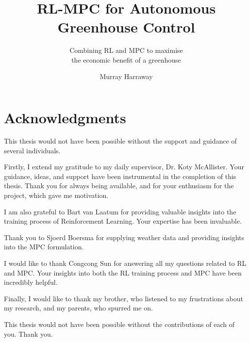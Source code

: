 \documentclass{tudelft-report}
\begin{document}
\frontmatter

\title{RL-MPC for Autonomous Greenhouse Control}
\subtitle{Combining RL and MPC to maximise  \\ the economic benefit of a greenhouse}
\author{Murray Harraway}

\subject{Systems and Control Masters Thesis} %

\makecover


% 
%


\tableofcontents


\newpage
\section*{Acknowledgments}
This thesis would not have been possible without the support and guidance of several individuals.

Firstly, I extend my gratitude to my daily supervisor, Dr. Koty McAllister. Your guidance, ideas, and support have been instrumental in the completion of this thesis. Thank you for always being available, and for your enthusiasm for the project, which gave me motivation.

I am also grateful to Bart van Laatum for providing valuable insights into the training process of Reinforcement Learning. Your expertise has been invaluable.

Thank you to Sjoerd Boersma for supplying weather data and providing insights into the MPC formulation.

I would like to thank Congcong Sun for answering all my questions related to RL and MPC. Your insights into both the RL training process and MPC have been incredibly helpful.

Finally, I would like to thank my brother, who listened to my frustrations about my research, and my parents, who spurred me on.

This thesis would not have been possible without the contributions of each of you. Thank you.

\end{document}
